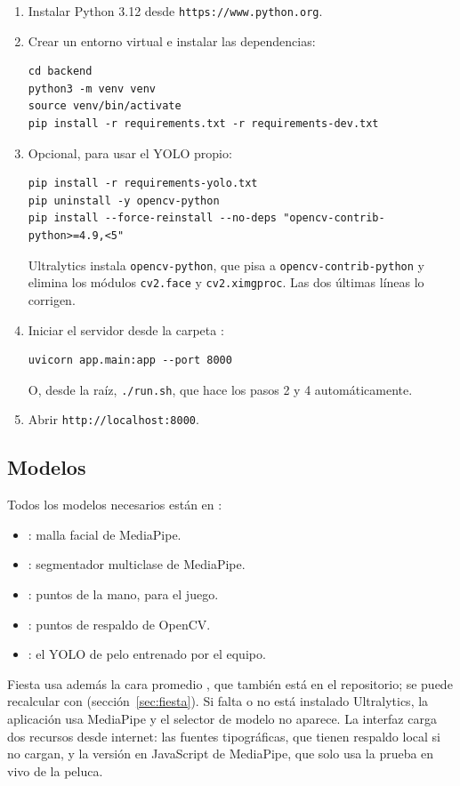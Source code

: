 \begin{enumerate}
  \item Instalar Python 3.12 desde \texttt{https://www.python.org}.
  \item Crear un entorno virtual e instalar las dependencias:
\begin{lstlisting}
cd backend
python3 -m venv venv
source venv/bin/activate
pip install -r requirements.txt -r requirements-dev.txt
\end{lstlisting}
  \item Opcional, para usar el YOLO propio:
\begin{lstlisting}
pip install -r requirements-yolo.txt
pip uninstall -y opencv-python
pip install --force-reinstall --no-deps "opencv-contrib-python>=4.9,<5"
\end{lstlisting}
  Ultralytics instala \texttt{opencv-python}, que pisa a \texttt{opencv-contrib-python} y elimina los módulos \texttt{cv2.face} y \texttt{cv2.ximgproc}. Las dos últimas líneas lo corrigen.
  \item Iniciar el servidor desde la carpeta :
\begin{lstlisting}
uvicorn app.main:app --port 8000
\end{lstlisting}
  O, desde la raíz, \texttt{./run.sh}, que hace los pasos 2 y 4 automáticamente.
  \item Abrir \texttt{http://localhost:8000}.
\end{enumerate}

\subsection{Modelos}

Todos los modelos necesarios están en :
\begin{itemize}
  \item {}: malla facial de MediaPipe.
  \item {}: segmentador multiclase de MediaPipe.
  \item {}: puntos de la mano, para el juego.
  \item {}: puntos de respaldo de OpenCV.
  \item {}: el YOLO de pelo entrenado por el equipo.
\end{itemize}
Fiesta usa además la cara promedio , que también está en el repositorio; se puede recalcular con  (sección~\ref{sec:fiesta}). Si falta  o no está instalado Ultralytics, la aplicación usa MediaPipe y el selector de modelo no aparece. La interfaz carga dos recursos desde internet: las fuentes tipográficas, que tienen respaldo local si no cargan, y la versión en JavaScript de MediaPipe, que solo usa la prueba en vivo de la peluca.

